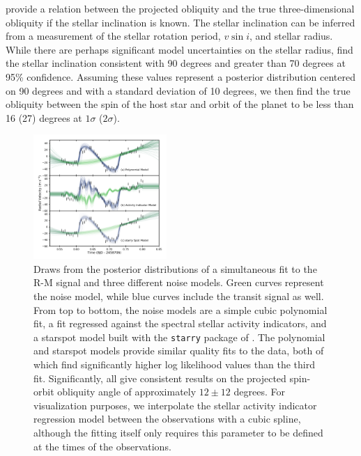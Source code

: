 \documentclass[twocolumn]{aastex63}
\newcommand{\vsini}{{$v \sin i$}}
\begin{document}
\citet{Cegla16} provide a relation between the projected obliquity and the true three-dimensional obliquity if the stellar inclination is known. 
The stellar inclination can be inferred from a measurement of the stellar rotation period, \vsini, and stellar radius. 
While there are perhaps significant model uncertainties on the stellar radius, \citet{Newton19} find the stellar inclination consistent with 90 degrees and greater than 70 degrees at 95\% confidence. Assuming these values represent a posterior distribution centered on 90 degrees and with a standard deviation of 10 degrees, we then find the true obliquity between the spin of the host star and orbit of the planet to be less than 16 (27) degrees at $1\sigma$ ($2\sigma$).



\begin{figure}[!tbh]
  \begin{center}
    \includegraphics[width=0.45\textwidth, trim={0cm 0.0cm 1cm 1cm}, clip=true]{../figures/model_comp.pdf}
   \end{center}
  \caption{Draws from the posterior distributions of a simultaneous fit to the
  R-M signal and three different noise models. Green curves represent the noise model, while blue curves include the transit signal as well. From top to bottom, the noise models are a simple cubic polynomial fit, a fit regressed against the spectral stellar activity indicators, and a starspot model built with the \texttt{starry} package of \citep{Luger19}. The polynomial and starspot models provide similar quality fits to the data, both of which find significantly higher log likelihood values than the third fit. Significantly, all give consistent results on the projected spin-orbit obliquity angle of approximately $12 \pm 12$ degrees. For visualization purposes, we interpolate the stellar activity indicator regression model between the observations with a cubic spline, although the fitting itself only requires this parameter to be defined at the times of the observations.}
  \label{fig:models}
\end{figure}
\end{document}
